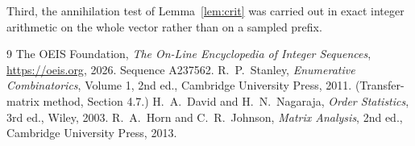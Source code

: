 \documentclass[11pt,a4paper]{article}
\theoremstyle{plain}
\theoremstyle{definition}
\begin{document}
Third, the annihilation test of Lemma~\ref{lem:crit} was carried out in exact integer
arithmetic on the whole vector rather than on a sampled prefix.

\begin{thebibliography}{9}
 The OEIS Foundation, \emph{The On-Line Encyclopedia of Integer
Sequences}, \url{https://oeis.org}, 2026. Sequence A237562.
 R.~P.~Stanley, \emph{Enumerative Combinatorics}, Volume 1, 2nd ed.,
Cambridge University Press, 2011. (Transfer-matrix method, Section 4.7.)
 H.~A.~David and H.~N.~Nagaraja, \emph{Order Statistics}, 3rd ed., Wiley,
2003.
 R.~A.~Horn and C.~R.~Johnson, \emph{Matrix Analysis}, 2nd ed., Cambridge
University Press, 2013.
\end{thebibliography}
\end{document}

